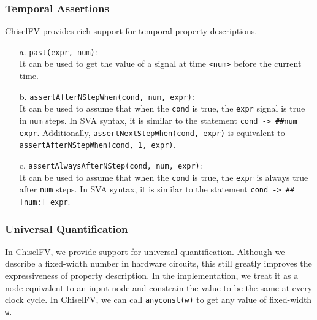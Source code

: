 \documentclass[conference]{IEEEtran}
\theoremstyle{definition}
\begin{document}
\subsubsection{Temporal Assertions} 
ChiselFV provides rich support for temporal property descriptions.
\begin{itemize}
    \item[a.] \verb|past(expr, num)|: \\ It can be used to get the value of a signal at time \verb|<num>| before the current time.
    \item[b.] \verb|assertAfterNStepWhen(cond, num, expr)|: \\ 
    It can be used to assume that when the \verb|cond| is true, the \verb|expr| signal is true in \verb|num| steps.
    In SVA syntax, it is similar to the statement \verb|cond -> ##num expr|.
    Additionally, \verb|assertNextStepWhen(cond, expr)| is equivalent to \verb|assertAfterNStepWhen(cond, 1, expr)|.
    \item[c.] \verb|assertAlwaysAfterNStep(cond, num, expr)|: \\
    It can be used to assume that when the \verb|cond| is true, the \verb|expr| is always true after \verb|num| steps. In SVA syntax, it is similar to the statement \verb|cond -> ##[num:] expr|.
\end{itemize}

\subsubsection{Universal Quantification}
In ChiselFV, we provide support for universal quantification. Although we describe a fixed-width number in hardware circuits, this still greatly improves the expressiveness of property description. In the implementation, we treat it as a node equivalent to an input node and constrain the value to be the same at every clock cycle. In ChiselFV, we can call \verb|anyconst(w)| to get any value of fixed-width \verb|w|.
\end{document}
